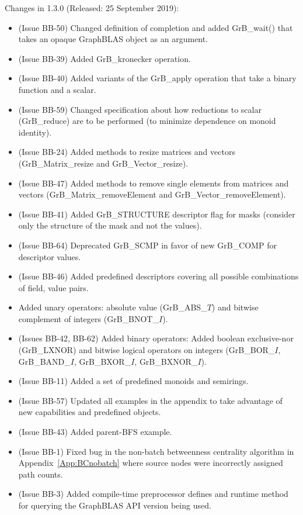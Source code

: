 Changes in 1.3.0 (Released: 25 September 2019):
\begin{itemize}
\item (Issue BB-50) Changed definition of completion and added {\sf GrB\_wait()} that takes an opaque GraphBLAS object as an argument.
\item (Issue BB-39) Added {\sf GrB\_kronecker} operation.
\item (Issue BB-40) Added variants of the {\sf GrB\_apply} operation that take a binary function and a scalar.
\item (Issue BB-59) Changed specification about how reductions to scalar ({\sf GrB\_reduce}) are to be performed (to minimize dependence on monoid identity).
\item (Issue BB-24) Added methods to resize matrices and vectors ({\sf GrB\_Matrix\_resize} and {\sf GrB\_Vector\_resize}).
\item (Issue BB-47) Added methods to remove single elements from matrices and vectors ({\sf GrB\_Matrix\_removeElement} and {\sf GrB\_Vector\_removeElement}).
\item (Issue BB-41) Added {\sf GrB\_STRUCTURE} descriptor flag for masks (consider only the structure of the mask and not the values).
\item (Issue BB-64) Deprecated {\sf GrB\_SCMP} in favor of new {\sf GrB\_COMP} for descriptor values.
\item (Issue BB-46) Added predefined descriptors covering all possible combinations of field, value pairs.
\item Added unary operators: absolute value ({\sf GrB\_ABS\_$T$}) and bitwise complement of integers ({\sf GrB\_BNOT\_$I$}). 
\item (Issues BB-42, BB-62) Added binary operators: Added boolean exclusive-nor ({\sf GrB\_LXNOR}) and bitwise logical operators on integers ({\sf GrB\_BOR\_$I$}, {\sf GrB\_BAND\_$I$}, {\sf GrB\_BXOR\_$I$}, {\sf GrB\_BXNOR\_$I$}).
\item (Issue BB-11) Added a set of predefined monoids and semirings.
\item (Issue BB-57) Updated all examples in the appendix to take advantage of new capabilities and predefined objects.
\item (Issue BB-43) Added parent-BFS example.
\item (Issue BB-1) Fixed bug in the non-batch betweenness centrality algorithm in 
Appendix~\ref{App:BCnobatch} where source nodes were incorrectly assigned path counts.
\item (Issue BB-3) Added compile-time preprocessor defines and runtime method for querying the GraphBLAS API version being used.

\end{itemize}
